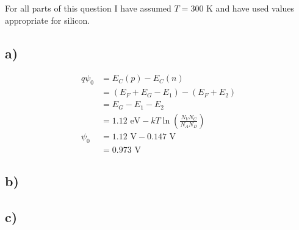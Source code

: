 For all parts of this question I have assumed $T = 300 \textrm{ K}$ and have used values appropriate for silicon.
\subsection*{a)}
	\[
	\begin{aligned}
		q \psi_0 &= E_C(p) - E_C(n) \\
			   &= (E_F + E_G - E_1) - (E_F + E_2) \\
			   &= E_G - E_1 - E_2 \\
			   &= 1.12 \textrm{ eV} - k T \ln \left( \frac{N_V N_C}{N_A N_D} \right) \\
			\psi_0  &=	1.12 \textrm{ V} - 0.147 \textrm{ V} \\
			   &= 0.973 \textrm{ V}	   
	\end{aligned}
	\]
\subsection*{b)}
\subsection*{c)}
	
